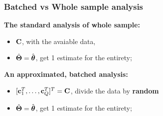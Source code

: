 \documentclass{beamer}
\begin{document}
\begin{frame}\frametitle{Batched vs Whole sample analysis}
  \textbf{The standard analysis of whole sample:}
  \begin{itemize}
  \item $\mathbf{C}$, with the avaiable data,
  \item $\hat{\boldsymbol{\Theta}}=\hat{\boldsymbol{\theta}}$, get 1 estimate for the entirety;
  \end{itemize}
  \textbf{An approximated, batched analysis:}
  \begin{itemize}
  \item $[\mathbf{c}_1^T, \dots, \mathbf{c}_Q^T ]^T = \mathbf{C}$, divide the data by \textbf{random}
  \item $\hat{\boldsymbol{\Theta}}=\hat{\boldsymbol{\theta}}$, get 1 estimate for the entirety;
  \end{itemize}
\end{frame}
\end{document}
